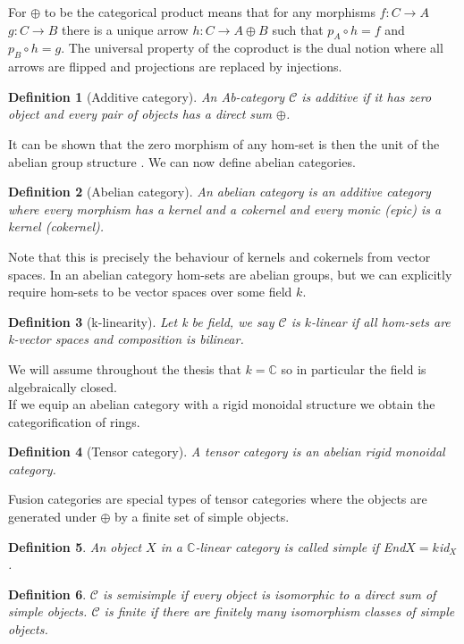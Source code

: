 \documentclass{article}
\newtheorem{definition}{Definition}
\begin{document}
	For $\oplus$ to be the categorical product means that for any morphisms $f:C \rightarrow A$ $g: C \rightarrow B$ there is a unique arrow $h: C \rightarrow A \oplus B$ such that $p_A\circ h = f$ and $p_B \circ h =g$. The universal property of the coproduct is the dual notion where all arrows are flipped and projections are replaced by injections.
	\begin{definition}[Additive category]
		An Ab-category $\mathcal{C}$ is additive if it has zero object and every pair of objects has a direct sum $\oplus$.
	\end{definition}
	It can be shown that the zero morphism of any hom-set is then the unit of the abelian group structure \cite{Vicary12}. We can now define abelian categories.
	\begin{definition}[Abelian category]
		An abelian category is an additive category where every morphism has a kernel and a cokernel and every monic (epic) is a kernel (cokernel).
	\end{definition} 
	Note that this is precisely the behaviour of kernels and cokernels from vector spaces. In an abelian category hom-sets are abelian groups, but we can explicitly require hom-sets to be vector spaces over some field $k$.
	\begin{definition}[k-linearity]
		Let k be field, we say $\mathcal{C}$ is $k$-linear if all hom-sets are k-vector spaces and composition is bilinear.
	\end{definition}We will assume throughout the thesis that $k=\mathbb{C}$ so in particular the field is algebraically closed.\\
	If we equip an abelian category with a rigid monoidal structure we obtain the categorification of rings.
	\begin{definition}[Tensor category]
		A tensor category is an abelian rigid monoidal category.
	\end{definition}
	Fusion categories are special types of tensor categories where the objects are generated under $\oplus$ by a finite set of simple objects.
	\begin{definition}
		An object $X$ in a $\mathbb{C}$-linear category is called simple if End$X=k$id$_X$.
	\end{definition}
	\begin{definition}
		$\mathcal{C}$ is semisimple if every object is isomorphic to a direct sum of simple objects. $\mathcal{C}$ is finite if there are finitely many isomorphism classes of simple objects.
	\end{definition}
\end{document}
